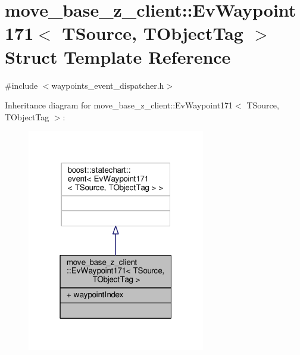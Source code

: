 \hypertarget{structmove__base__z__client_1_1EvWaypoint171}{}\section{move\+\_\+base\+\_\+z\+\_\+client\+:\+:Ev\+Waypoint171$<$ T\+Source, T\+Object\+Tag $>$ Struct Template Reference}
\label{structmove__base__z__client_1_1EvWaypoint171}


{\ttfamily \#include $<$waypoints\+\_\+event\+\_\+dispatcher.\+h$>$}



Inheritance diagram for move\+\_\+base\+\_\+z\+\_\+client\+:\+:Ev\+Waypoint171$<$ T\+Source, T\+Object\+Tag $>$\+:\nopagebreak
\begin{figure}[H]
\begin{center}
\leavevmode
\includegraphics[width=220pt]{structmove__base__z__client_1_1EvWaypoint171__inherit__graph}
\end{center}
\end{figure}


